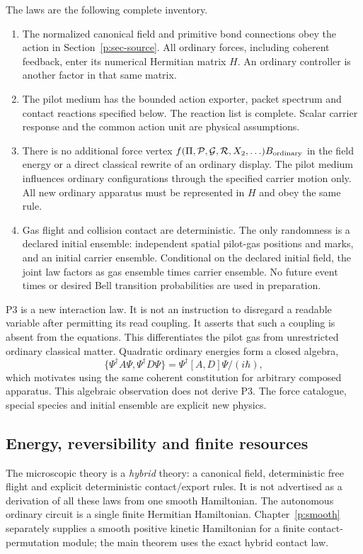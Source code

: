 \documentclass[11pt,oneside,openany]{book}
\theoremstyle{definition}
\theoremstyle{remark}\newtheorem{remark}[theorem]{Remark}
\begin{document}
The laws are the following complete inventory.
\begin{enumerate}[label=\textbf{P\arabic*.}]
\item The normalized canonical field and primitive bond connections obey the action in Section~\ref{p:sec-source}. All ordinary forces, including coherent feedback, enter its numerical Hermitian matrix $H$. An ordinary controller is another factor in that same matrix.
\item The pilot medium has the bounded action exporter, packet spectrum and contact reactions specified below. The reaction list is complete. Scalar carrier response and the common action unit are physical assumptions.
\item There is no additional force vertex $f(\Pi,\mathcal P,\mathcal G,\mathcal R,X_2,\ldots)B_{\rm ordinary}$ in the field energy or a direct classical rewrite of an ordinary display. The pilot medium influences ordinary configurations through the specified carrier motion only. All new ordinary apparatus must be represented in $H$ and obey the same rule.
\item Gas flight and collision contact are deterministic. The only randomness is a declared initial ensemble: independent spatial pilot-gas positions and marks, and an initial carrier ensemble. Conditional on the declared initial field, the joint law factors as gas ensemble times carrier ensemble. No future event times or desired Bell transition probabilities are used in preparation.
\end{enumerate}
P3 is a new interaction law. It is not an instruction to disregard a readable variable after permitting its read coupling. It asserts that such a coupling is absent from the equations. This differentiates the pilot gas from unrestricted ordinary classical matter. Quadratic ordinary energies form a closed algebra,
\[
 \{\Psi^\dagger A\Psi,\Psi^\dagger D\Psi\}
   =\Psi^\dagger[A,D]\Psi/(i\hbar),
\]
which motivates using the same coherent constitution for arbitrary composed apparatus. This algebraic observation does not derive P3. The force catalogue, special species and initial ensemble are explicit new physics.

\subsection{Energy, reversibility and finite resources}
The microscopic theory is a \emph{hybrid} theory: a canonical field, deterministic free flight and explicit deterministic contact/export rules. It is not advertised as a derivation of all these laws from one smooth Hamiltonian. The autonomous ordinary circuit is a single finite Hermitian Hamiltonian. Chapter~\ref{p:smooth} separately supplies a smooth positive kinetic Hamiltonian for a finite contact-permutation module; the main theorem uses the exact hybrid contact law.
\end{document}
